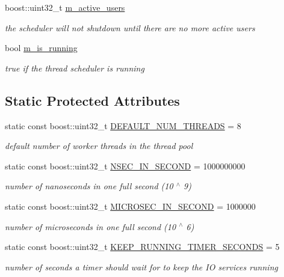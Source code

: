 \begin{DoxyCompactItemize}
boost\-::uint32\-\_\-t \hyperlink{classpion_1_1scheduler_aa8028397b2e084c8808032ac448955b8}{m\-\_\-active\-\_\-users}
\begin{DoxyCompactList}\small\item\em the scheduler will not shutdown until there are no more active users \end{DoxyCompactList}\item 
bool \hyperlink{classpion_1_1scheduler_a1fa5ef108570fe6c4a984fb1c01e8bd9}{m\-\_\-is\-\_\-running}
\begin{DoxyCompactList}\small\item\em true if the thread scheduler is running \end{DoxyCompactList}\end{DoxyCompactItemize}
\subsection*{Static Protected Attributes}
\begin{DoxyCompactItemize}
\item 
static const boost\-::uint32\-\_\-t \hyperlink{classpion_1_1scheduler_ab8d6ac8ea6a3946abe86cbd20f0783e0}{D\-E\-F\-A\-U\-L\-T\-\_\-\-N\-U\-M\-\_\-\-T\-H\-R\-E\-A\-D\-S} = 8
\begin{DoxyCompactList}\small\item\em default number of worker threads in the thread pool \end{DoxyCompactList}\item 
static const boost\-::uint32\-\_\-t \hyperlink{classpion_1_1scheduler_aa5633b15c629c78c2aeb451ae428ea25}{N\-S\-E\-C\-\_\-\-I\-N\-\_\-\-S\-E\-C\-O\-N\-D} = 1000000000
\begin{DoxyCompactList}\small\item\em number of nanoseconds in one full second (10 $^\wedge$ 9) \end{DoxyCompactList}\item 
static const boost\-::uint32\-\_\-t \hyperlink{classpion_1_1scheduler_acbe8f3104aa4713c93bbf3f2abe8615a}{M\-I\-C\-R\-O\-S\-E\-C\-\_\-\-I\-N\-\_\-\-S\-E\-C\-O\-N\-D} = 1000000
\begin{DoxyCompactList}\small\item\em number of microseconds in one full second (10 $^\wedge$ 6) \end{DoxyCompactList}\item 
static const boost\-::uint32\-\_\-t \hyperlink{classpion_1_1scheduler_a4f2047f8ecdaf5901f3548ee693b39ce}{K\-E\-E\-P\-\_\-\-R\-U\-N\-N\-I\-N\-G\-\_\-\-T\-I\-M\-E\-R\-\_\-\-S\-E\-C\-O\-N\-D\-S} = 5
\begin{DoxyCompactList}\small\item\em number of seconds a timer should wait for to keep the I\-O services running \end{DoxyCompactList}\end{DoxyCompactItemize}


